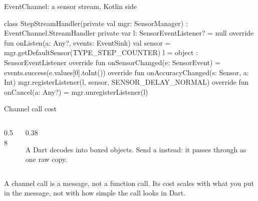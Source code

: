 \documentclass[10pt,aspectratio=169,t]{beamer}
\begin{document}
\begin{frame}[fragile,eyebrow=Channels]{EventChannel: a sensor stream, Kotlin side}
\begin{kotlin}[aboveskip=1mm,belowskip=1mm]
class StepStreamHandler(private val mgr: SensorManager) :
    EventChannel.StreamHandler {
  private var l: SensorEventListener? = null
  override fun onListen(a: Any?, events: EventSink) {
    val sensor = mgr.getDefaultSensor(TYPE_STEP_COUNTER)
    l = object : SensorEventListener {
      override fun onSensorChanged(e: SensorEvent) =
          events.success(e.values[0].toInt())
      override fun onAccuracyChanged(s: Sensor, a: Int) {}
    }
    mgr.registerListener(l, sensor, SENSOR_DELAY_NORMAL)
  }
  override fun onCancel(a: Any?) = mgr.unregisterListener(l)
}
\end{kotlin}
\end{frame}

\begin{frame}[eyebrow=Channels]{Channel call cost}
  \begin{columns}[T]
    \begin{column}{0.58\textwidth}
    \end{column}
    \begin{column}{0.38\textwidth}
      \begin{warning}
        A Dart  decodes into boxed objects. Send a  instead: it passes through as one raw copy.
      \end{warning}
    \end{column}
  \end{columns}
  \begin{takeaway}{A channel call is a message, not a function call.}
    Its cost scales with what you put in the message, not with how simple the call looks in Dart.
  \end{takeaway}
\end{frame}
\end{document}
